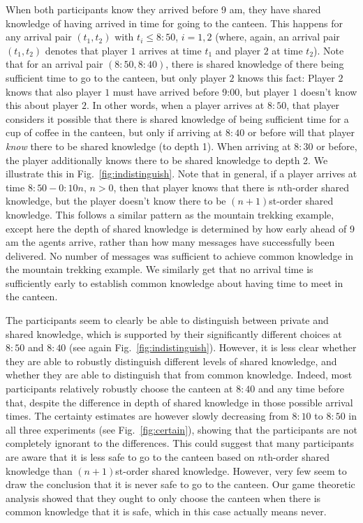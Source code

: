 \documentclass[twocolumn,a4paper,superscriptaddress,nofootinbib]{revtex4}
\begin{document}
When both participants know they arrived before 9 am, they have shared knowledge of having arrived in time for going to the canteen. This happens for any arrival pair $(t_1,t_2)$ with $t_i \leq 8{:}50$, $i=1,2$ (where, again, an arrival pair $(t_1,t_2)$ denotes that player $1$ arrives at time $t_1$ and player $2$ at time $t_2$). Note that for an arrival pair $(8{:}50,8{:}40)$, there is shared knowledge of there being sufficient time to go to the canteen, but only player $2$ knows this fact: Player $2$ knows that also player $1$ must have arrived before 9{:}00, but player $1$ doesn't know this about player $2$. In other words, when a player arrives at $8{:}50$, that player considers it possible that there is shared knowledge of being sufficient time for a cup of coffee in the canteen, but only if arriving at $8{:}40$ or before will that player \emph{know} there to be shared knowledge (to depth 1). When arriving at $8{:}30$ or before, the player additionally knows there to be shared knowledge to depth 2. We illustrate this in Fig.~\ref{fig:indistinguish}. Note that in general, if a player arrives at time $8{:}50-0{:}10n$, $n>0$, then that player knows that there is $n$th-order shared knowledge, but the player doesn't know there to be $(n+1)$st-order shared knowledge. This follows a similar pattern as the mountain trekking example, except here the depth of shared knowledge is determined by how early ahead of 9 am the agents arrive, rather than how many messages have successfully been delivered. No number of messages was sufficient to achieve common knowledge in the mountain trekking example. We similarly get that no arrival time is sufficiently early to establish common knowledge about having time to meet in the canteen. 

The participants seem to clearly be able to distinguish between private and shared knowledge, which is supported by their significantly different choices at $8{:}50$ and $8{:}40$ (see again Fig.~\ref{fig:indistinguish}). However, it is less clear whether they are able to robustly distinguish different levels of shared knowledge, and whether they are able to distinguish that from common knowledge. Indeed, most participants relatively robustly choose the canteen at $8{:}40$ and any time before that, despite the difference in depth of shared knowledge in those possible arrival times. The certainty estimates are however slowly decreasing from $8{:}10$ to $8{:}50$ in all three experiments (see Fig.~\ref{fig:certain}), showing that the participants are not completely ignorant to the differences. This could suggest that many participants are aware that it is less safe to go to the canteen based on $n$th-order shared knowledge than $(n+1)$st-order shared knowledge. However, very few seem to draw the conclusion that it is never safe to go to the canteen. Our game theoretic analysis showed that they ought to only choose the canteen when there is common knowledge that it is safe, which in this case actually means never.
\end{document}
